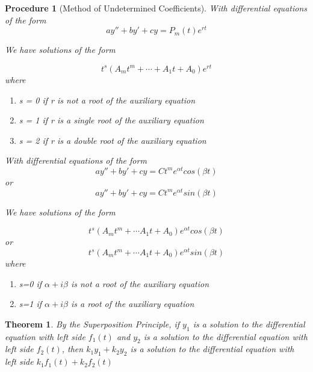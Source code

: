 \documentclass[12pt]{report}
\newtheorem{thm}{Theorem}
\newtheorem{proc}{Procedure}
\begin{document}
\begin{proc}[Method of Undetermined Coefficients]
With differential equations of the form
\begin{equation}
ay''+by'+cy=P_m(t)e^{rt}
\end{equation}

We have solutions of the form

\begin{equation}
t^s(A_mt^m+\cdots+A_1t+A_0)e^{rt}
\end{equation}
where
\begin{enumerate}
\item s = 0 if r is not a root of the auxiliary equation
\item s = 1 if r is a single root of the auxiliary equation
\item s = 2 if r is a double root of the auxiliary equation
\end{enumerate}

With differential equations of the form
\begin{equation}
ay''+by'+cy=Ct^me^{\alpha t}cos(\beta t)
\end{equation}
or
\begin{equation}
ay''+by'+cy=Ct^me^{\alpha t}sin(\beta t)
\end{equation}

We have solutions of the form

\begin{equation}
t^s(A_mt^m+\cdots A_1t+A_0)e^{\alpha t}cos(\beta t)
\end{equation}
or
\begin{equation}
t^s(A_mt^m+\cdots A_1t+A_0)e^{\alpha t}sin(\beta t)
\end{equation}
where
\begin{enumerate}
\item s=0 if $\alpha+i\beta$ is not a root of the auxiliary equation
\item s=1 if $\alpha+i\beta$ is a root of the auxiliary equation
\end{enumerate}

\end{proc}

\begin{thm}
By the Superposition Principle, if $y_1$ is a solution to the differential equation with left side $f_1(t)$ and $y_2$ is a solution to the differential equation with left side $f_2(t)$, then $k_1y_1+k_2y_2$ is a solution to the differential equation with left side $k_1f_1(t)+k_2f_2(t)$
\end{thm}
\end{document}
